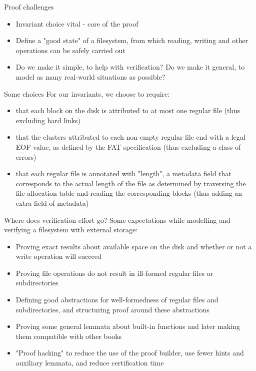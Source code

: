 \documentclass{beamer}
\begin{document}
\begin{frame}{Proof challenges}
  \begin{itemize}
  \item Invariant choice vital - core of the proof
  \item Define a "good state" of a filesystem, from which reading,
    writing and other operations can be safely carried out
  \item Do we make it simple, to help with verification? Do we make it
    general, to model as many real-world situations as possible?
  \end{itemize}
\end{frame}

\begin{frame}{Some choices}
  For our invariants, we choose to require:
    \begin{itemize}
    \item that each block on the disk is attributed to at most one
      regular file {\color[rgb]{0,0,1} (thus excluding hard links)}
    \item that the clusters attributed to each non-empty regular file
      end with a legal EOF value, as defined by the FAT specification
      {\color[rgb]{0,0,1} (thus excluding a class of errors)}
    \item that each regular file is annotated with "length", a
      metadata field that corresponds to the actual length of the file
      as determined by traversing the file allocation table and
      reading the corresponding blocks {\color[rgb]{0,0,1} (thus
        adding an extra field of metadata)}
    \end{itemize}
\end{frame}

\begin{frame}{Where does verification effort go?}
  Some expectations while modelling and verifying a filesystem with external storage:
  \begin{itemize}
  \item Proving exact results about available space on the disk and
    whether or not a write operation will succeed
  \item Proving file operations do not result in ill-formed regular
    files or subdirectories
  \item Defining good abstractions for well-formedness of regular
    files and subdirectories, and structuring proof around these
    abstractions
  \item Proving some general lemmata about built-in functions and
    later making them compatible with other books
  \item "Proof hacking" to reduce the use of the proof builder, use
    fewer hints and auxiliary lemmata, and reduce certification time
  \end{itemize}
\end{frame}
\end{document}
